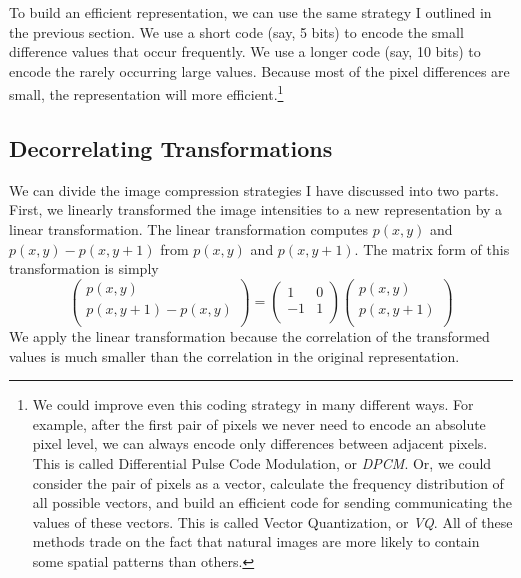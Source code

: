 To build an efficient representation, we can use the same strategy I
outlined in the previous section.  We use a short code (say, 5 bits)
to encode the small difference values that occur frequently.  We use a
longer code (say, 10 bits) to encode the rarely occurring large
values.  Because most of the pixel differences are small, the
representation will more efficient.\footnote{ We could improve even
this coding strategy in many different ways.  For example, after the
first pair of pixels we never need to encode an absolute pixel level,
we can always encode only differences between adjacent pixels.  This
is called Differential Pulse Code Modulation, or {\em DPCM}.  Or, we
could consider the pair of pixels as a vector, calculate the frequency
distribution of all possible vectors, and build an efficient code for
sending communicating the values of these vectors.  This is called
Vector Quantization, or {\em VQ}.  All of these methods trade on the
fact that natural images are more likely to contain some spatial
patterns than others.  }

\subsection*{Decorrelating Transformations} We can divide the image
compression strategies I have discussed into two parts.  First, we
linearly transformed the image intensities to a new representation by
a linear transformation.  The linear transformation computes $p(x,y)$
and $p(x,y)-p(x,y+1)$ from $p(x,y)$ and $p(x,y+1)$.  The
matrix form of this transformation is simply
\begin{equation} \label{e7:decorrelate}
 \left ( \begin{array}{c} p(x,y) \\ p(x,y+1) - p(x,y)
 \\ \end{array} \right ) = \left ( \begin{array}{cc} 1 & 0 \\ -1 & 1
 \\ \end{array} \right ) \left ( \begin{array}{c} p(x,y) \\ p(x,y+1)
 \\ \end{array} \right )
\end{equation} We apply the linear transformation because the
correlation of the transformed values is much smaller than the
correlation in the original representation.

